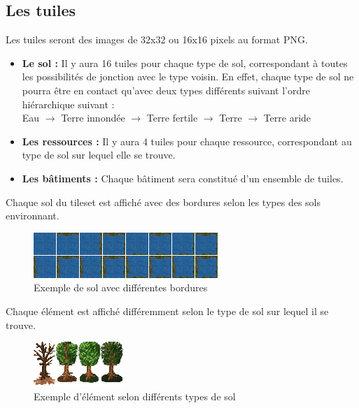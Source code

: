 \documentclass[a4paper]{memoir}
\begin{document}
			\subsection{Les tuiles}
				\label{Tuile}
				Les tuiles seront des images de 32x32 ou 16x16 pixels au format PNG.\\
				\begin{itemize}[label=$\bullet$]
					\item \textbf{Le sol :} Il y aura 16 tuiles pour chaque type de sol, correspondant à toutes les possibilités de jonction avec le type voisin. En effet, chaque type de sol ne pourra être en contact qu'avec deux types différents suivant l'ordre hiérarchique suivant :\\
					Eau $\rightarrow$ Terre innondée $\rightarrow$ Terre fertile $\rightarrow$ Terre $\rightarrow$ Terre aride
					\item \textbf{Les ressources :} Il y aura 4 tuiles pour chaque ressource, correspondant au type de sol sur lequel elle se trouve.
					\item \textbf{Les bâtiments :} Chaque bâtiment sera constitué d'un ensemble de tuiles.
				\end{itemize}
				Chaque sol du tileset est affiché avec des bordures selon les types des sols environnant.\\
				\begin{figure}[H]
					\begin{center}
						\includegraphics[scale=1]{img/groundSample.png}
					\end{center}
					\label{fig:groundSample}
					\caption{Exemple de sol avec différentes bordures}
				\end{figure}
				Chaque élément est affiché différemment selon le type de sol sur lequel il se trouve.\\
				\begin{figure}[H]
					\begin{center}
						\includegraphics[scale=1]{img/elementSample.png}
					\end{center}
					\label{fig:elementSample}
					\caption{Exemple d'élément selon différents types de sol}
				\end{figure}
	
\end{document}
